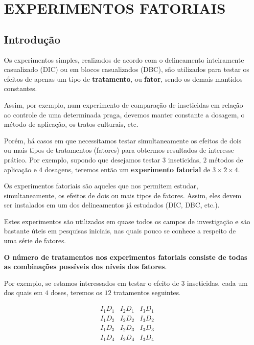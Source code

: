 \documentclass[
]{article}
\author{}
\date{\vspace{-2.5em}}
\begin{document}
\section{EXPERIMENTOS FATORIAIS}\label{experimentos-fatoriais}

\subsection{Introdução}\label{introduuxe7uxe3o}

Os experimentos simples, realizados de acordo com o delineamento
inteiramente casualizado (DIC) ou em blocos casualizados (DBC), são
utilizados para testar os efeitos de apenas um tipo de
\textbf{tratamento}, ou \textbf{fator}, sendo os demais mantidos
constantes.

Assim, por exemplo, num experimento de comparação de inseticidas em
relação ao controle de uma determinada praga, devemos manter constante a
dosagem, o método de aplicação, os tratos culturais, etc.

Porém, há casos em que necessitamos testar simultaneamente os efeitos de
dois ou mais tipos de tratamentos (fatores) para obtermos resultados de
interesse prático. Por exemplo, supondo que desejamos testar \(3\)
inseticidas, \(2\) métodos de aplicação e \(4\) dosagens, teremos então
um \textbf{experimento fatorial} de \(3\times2\times4\).

Os experimentos fatoriais são aqueles que nos permitem estudar,
simultaneamente, os efeitos de dois ou mais tipos de fatores. Assim,
eles devem ser instalados em um dos delineamentos já estudados (DIC,
DBC, etc.).

Estes experimentos são utilizados em quase todos os campos de
investigação e são bastante úteis em pesquisas iniciais, nas quais pouco
se conhece a respeito de uma série de fatores.

\textbf{O número de tratamentos nos experimentos fatoriais consiste de
todas as combinações possíveis dos níveis dos fatores}.

Por exemplo, se estamos interessados em testar o efeito de \(3\)
inseticidas, cada um dos quais em \(4\) doses, teremos os \(12\)
tratamentos seguintes.

\[
\begin{array}{} 
I_1 D_1  & I_2D_1  & I_3D_1 \\
I_1D_2  & I_2D_2  & I_3D_2 \\
I_1D_3  & I_2D_3  & I_3D_3 \\ 
I_1D_4  & I_2D_4  & I_3D_4 \end{array}
\]
\end{document}
